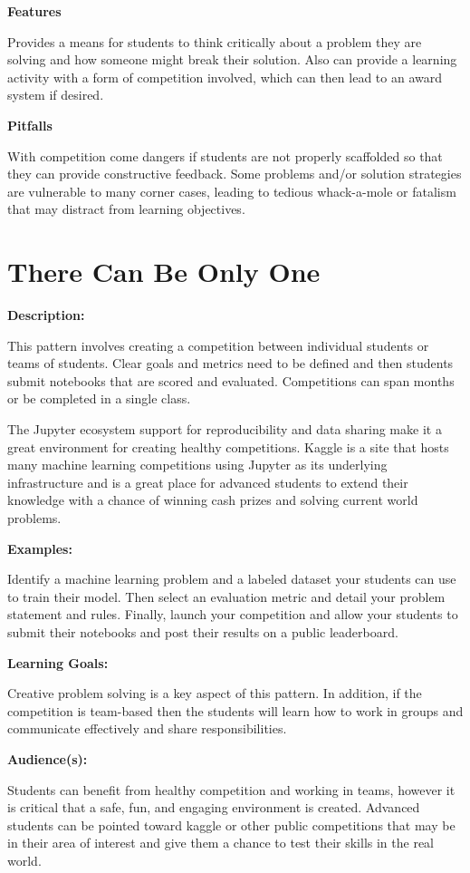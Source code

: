 \documentclass[]{book}
\begin{document}
\textbf{Features}

Provides a means for students to think critically about a problem they
are solving and how someone might break their solution. Also can provide
a learning activity with a form of competition involved, which can then
lead to an award system if desired.

\textbf{Pitfalls}

With competition come dangers if students are not properly scaffolded so
that they can provide constructive feedback. Some problems and/or
solution strategies are vulnerable to many corner cases, leading to
tedious whack-a-mole or fatalism that may distract from learning
objectives.

\section{There Can Be Only One}\label{there-can-be-only-one}

\textbf{Description:}

This pattern involves creating a competition between individual students
or teams of students. Clear goals and metrics need to be defined and
then students submit notebooks that are scored and evaluated.
Competitions can span months or be completed in a single class.

The Jupyter ecosystem support for reproducibility and data sharing make
it a great environment for creating healthy competitions. Kaggle is a
site that hosts many machine learning competitions using Jupyter as its
underlying infrastructure and is a great place for advanced students to
extend their knowledge with a chance of winning cash prizes and solving
current world problems.

\textbf{Examples:}

Identify a machine learning problem and a labeled dataset your students
can use to train their model. Then select an evaluation metric and
detail your problem statement and rules. Finally, launch your
competition and allow your students to submit their notebooks and post
their results on a public leaderboard.

\textbf{Learning Goals:}

Creative problem solving is a key aspect of this pattern. In addition,
if the competition is team-based then the students will learn how to
work in groups and communicate effectively and share responsibilities.

\textbf{Audience(s):}

Students can benefit from healthy competition and working in teams,
however it is critical that a safe, fun, and engaging environment is
created. Advanced students can be pointed toward kaggle or other public
competitions that may be in their area of interest and give them a
chance to test their skills in the real world.
\end{document}
